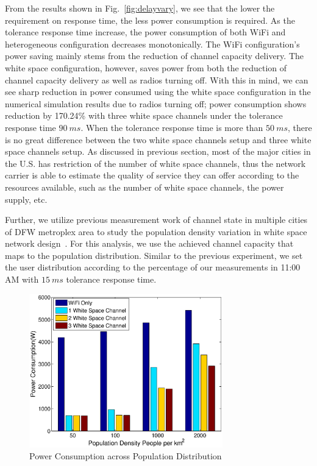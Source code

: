 From the results shown in Fig.~\ref{fig:delayvary}, we see that the lower the requirement on response time, the less power consumption is required.
As the tolerance response time increase, the power consumption of both WiFi and heterogeneous configuration decreases monotonically. 
The WiFi configuration's power saving mainly stems from the reduction of channel capacity delivery. 
The white space configuration, however, saves power from both the reduction of channel capacity delivery as well as radios turning off. 
With this in mind, we can see sharp reduction in power consumed using the white space configuration in the numerical simulation results due to radios turning off; power consumption shows reduction by 170.24\% with three white space channels under the tolerance response time $90\ ms$.
When the tolerance response time is more than $50\ ms$, there is no great difference between the two white space channels setup and three white space channels setup. 
As discussed in previous section, most of the major cities in the U.S. has restriction of the number of white space channels, thus the network carrier is able to estimate the quality of service they can offer according to the resources available, such as the number of white space channels, the power supply, etc.


Further, we utilize previous measurement work of channel state in multiple cities of DFW metroplex area to study the population density variation in white space network design~\cite{pcuiwinmee}.
For this analysis, we use the achieved channel capacity that maps to the population distribution. 
Similar to the previous experiment, we set the user distribution according to the percentage of our measurements in 11:00 AM with $15\ ms$ tolerance response time.

\begin{figure}[hpt]
\vspace{-0.0in}
\centering
\includegraphics[width=84mm]{figures/populationvary}
\vspace{-0.1in}
\caption{Power Consumption across Population Distribution}
\label{fig:populationvary}
\vspace{-0.1in}
\end{figure}

